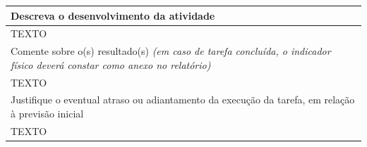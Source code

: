 \documentclass[a4paper,12pt]{article}
\begin{document}
\begin{table}[h]
\begin{longtable}{|p{}|} %
    \hline
    \rowcolor{lightgray} 
    \fontsize{8}{10}\selectfont Descreva o desenvolvimento da atividade \\ \hline 
    \endhead
    
    \fontsize{10}{12}\selectfont 
    TEXTO \\ \hline
    
    \rowcolor{lightgray} 
    \fontsize{8}{10}\selectfont Comente sobre o(s) resultado(s) \textit{(em caso de tarefa concluída, o indicador físico deverá constar como anexo no relatório)} \\
    \hline
    {\fontsize{10}{12}\selectfont TEXTO} \\ \hline
    
    \rowcolor{lightgray} 
    \fontsize{8}{10}\selectfont Justifique o eventual atraso ou adiantamento da execução da tarefa, em relação à previsão inicial \\
    \hline
    {\fontsize{10}{12}\selectfont TEXTO} \\ \hline
\end{longtable}
\end{table}



\newpage


\end{document}
